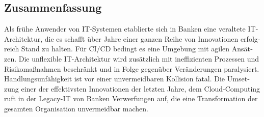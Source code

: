 \begin{otherlanguage}{ngerman}
	\chapter*{Zusammenfassung}
	Als frühe Anwender von IT-Systemen etablierte sich in Banken eine veraltete IT-Architektur, die es schafft über Jahre einer ganzen Reihe von Innovationen erfolgreich Stand zu halten. 
	Für CI/CD bedingt es eine Umgebung mit agilen Ansätzen. Die unflexible IT-Architektur wird zusätzlich mit ineffizienten Prozessen und Risikomaßnahmen beschränkt und in Folge gegenüber Veränderungen paralysiert. Handlungsunfähigkeit ist vor einer unvermeidbaren Kollision fatal.
	Die Umsetzung einer der effektivsten Innovationen der letzten Jahre, dem Cloud-Computing ruft in der Legacy-IT von Banken Verwerfungen auf, die eine Transformation der gesamten Organisation unvermeidbar machen.
	\end{otherlanguage}
